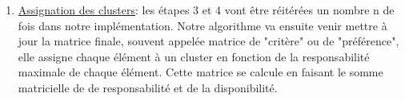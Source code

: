 \begin{enumerate}
    \item \underline{Assignation des clusters}: les étapes 3 et 4 vont être réitérées un nombre n de fois dans notre implémentation. Notre algorithme va ensuite venir mettre à jour la matrice finale, souvent appelée matrice de "critère" ou de "préférence", elle assigne chaque élément à un cluster en fonction de la responsabilité maximale de chaque élément. Cette matrice se calcule en faisant le somme matricielle de de responsabilité et de la disponibilité.
    
\end{enumerate}




